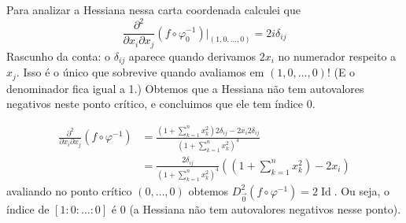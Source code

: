 	Para analizar a Hessiana nessa carta coordenada calculei que
	\[\frac{\partial^2}{\partial x_i\partial x_j}(f \circ \varphi_0^{-1})\Big|_{(1,0,\ldots,0)}=2i\delta_{ij}\]
Rascunho da conta: o \(\delta_{ij}\) aparece quando derivamos \(2x_i\) no numerador respeito a \(x_j\). Isso é o único que sobrevive quando avaliamos em \((1,0,\ldots,0)\)! (E o denominador fica igual a 1.) Obtemos que a Hessiana não tem autovalores negativos neste ponto crítico, e concluimos que ele tem índice 0.

	\begin{align*}
	\frac{\partial^2}{\partial x_i\partial x_j}(f \circ \varphi^{-1})&=\frac{\left(1+\sum_{k=1}^nx_k^2\right) 2 \delta_{ij}-2x_i 2\delta_{ij}}{\left(1+\sum_{k=1}^nx_k^2\right)^4}\\
	&=\frac{2\delta_{ij}}{\left(1+\sum_{k=1}^n x_k^2\right)^4}\left(\left(1+\sum_{k=1}^nx_k^2\right) -2x_i\right) 
	\end{align*}
	avaliando no ponto crítico \((0,\ldots,0)\) obtemos \(D^2_{\vec{0}}(f\circ \varphi^{-1})=2\operatorname{Id}\). Ou seja, o índice de \([1:0:\ldots:0]\) é \(0\) (a Hessiana não tem autovalores negativos nesse ponto).\fi


